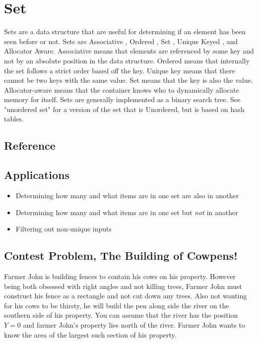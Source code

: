 \section{Set}
Sets are a data structure that are useful for determining if an element has been seen before or not.
Sets are Associative , Ordered , Set , Unique Keyed , and Allocator Aware\cite{cplusplus}.
Associative means that elements are referenced by some key and not by an absolute position in the data structure.
Ordered means that internally the set follows a strict order based off the key.
Unique key means that there cannot be two keys with the same value.
Set means that the key is also the value.
Allocator-aware means that the container knows who to dynamically allocate memory for itself.
Sets are generally implemented as a binary search tree.
See "unordered set" for a version of the set that is Unordered, but is based on hash tables.

\subsection{Reference}


\subsection{Applications}

\begin{itemize}
    \item   Determining how many and what items are in one set are also in another
    \item   Determining how many and what items are in one set but \emph{not} in another
    \item   Filtering out non-unique inputs
\end{itemize}

\subsection{Contest Problem, The Building of Cowpens!}
Farmer John is building fences to contain his cows on his property.
However being both obsessed with right angles and not killing trees, Farmer John must construct his fence as a rectangle and not cut down any trees.
Also not wanting for his cows to be thirsty, he will build the pen along side the river on the southern side of his property.
You can assume that the river has the position $Y=0$ and farmer John's property lies north of the river.
Farmer John wants to know the area of the largest such section of his property.

